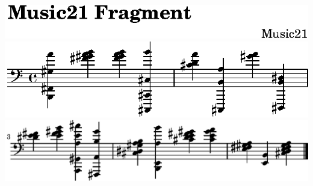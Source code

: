 \includegraphics{./bw3/13/lily-56e91e70-1}%
\ifx\betweenLilyPondSystem \undefined
  \linebreak
\else
  \expandafter{}%
\fi
\includegraphics{./bw3/13/lily-56e91e70-2}%
\ifx\betweenLilyPondSystem \undefined
  \linebreak
\else
  \expandafter{}%
\fi
\includegraphics{./bw3/13/lily-56e91e70-3}%
